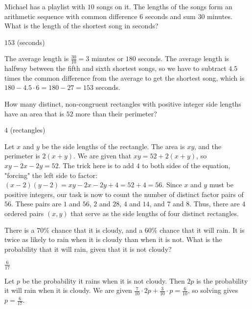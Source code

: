 \documentclass[11pt]{article}
\begin{document}
\begin{problem}%
Michael has a playlist with $10$ songs on it. The lengths of the songs form an arithmetic sequence with common difference $6$ seconds and sum $30$ minutes. What is the length of the shortest song in seconds?
\end{problem}

\begin{answer}
$\boxed{153}$ (seconds)
\end{answer}

\begin{solution}
The average length is $\frac{30}{10} = 3$ minutes or $180$ seconds. The average length is halfway between the fifth and sixth shortest songs, so we have to subtract $4.5$ times the common difference from the average to get the shortest song, which is $180 - 4.5 \cdot 6 = 180 - 27 = \boxed{153}$ seconds.
\end{solution}



\begin{problem}%
How many distinct, non-congruent rectangles with positive integer side lengths have an area that is $52$ more than their perimeter?
\end{problem}

\begin{answer}
$\boxed{4}$ (rectangles)
\end{answer}

\begin{solution}
Let $x$ and $y$ be the side lengths of the rectangle. The area is $xy$, and the perimeter is $2(x+y)$. We are given that $xy = 52 + 2(x+y)$, so $xy - 2x - 2y = 52$. The trick here is to add $4$ to both sides of the equation, "forcing" the left side to factor: $(x-2)(y-2) = xy - 2x - 2y + 4 = 52 + 4 = 56$. Since $x$ and $y$ must be positive integers, our task is now to count the number of distinct factor pairs of $56$. These pairs are $1$ and $56$, $2$ and $28$, $4$ and $14$, and $7$ and $8$. Thus, there are $\boxed{4}$ ordered pairs $(x, y)$ that serve as the side lengths of four distinct rectangles.
\end{solution}


\begin{problem}%
There is a $70\%$ chance that it is cloudy, and a $60\%$ chance that it will rain. It is twice as likely to rain when it is cloudy than when it is not. What is the probability that it will rain, given that it is not cloudy?
\end{problem}

\begin{answer}
$\boxed{\frac{6}{17}}$
\end{answer}

\begin{solution}
Let $p$ be the probability it rains when it is not cloudy. Then $2p$ is the probability it will rain when it is cloudy. We are given $\frac{7}{10} \cdot 2p + \frac{3}{10} \cdot p = \frac{6}{10}$, so solving gives $p = \boxed{\frac{6}{17}}$.
\end{solution}
\end{document}
